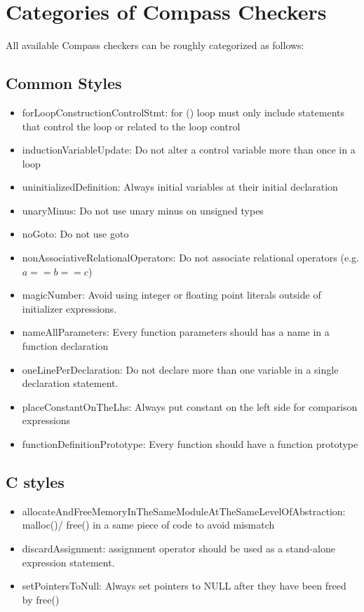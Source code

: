 \chapter{Categories of Compass Checkers}
All available Compass checkers can be roughly categorized as follows:

\section{Common Styles}
\begin{itemize}
\item forLoopConstructionControlStmt: for () loop must only include statements that control the loop or related to the loop control
\item inductionVariableUpdate: Do not alter a control variable more than once in a loop
\item uninitializedDefinition: Always initial variables at their initial declaration
\item unaryMinus: Do not use unary minus on unsigned types
\item noGoto: Do not use goto
\item nonAssociativeRelationalOperators: Do not associate relational
operators (e.g. $a==b==c$)
\item magicNumber: Avoid using integer or floating point literals outside of initializer expressions.
\item nameAllParameters: Every function parameters should has a name in a function declaration
\item oneLinePerDeclaration: Do not declare more than one variable in a single declaration statement. 
\item placeConstantOnTheLhs: Always put constant on the left side for comparison expressions
\item functionDefinitionPrototype: Every function should have a function prototype
\end{itemize}

\section{C styles}
\begin{itemize}
\item allocateAndFreeMemoryInTheSameModuleAtTheSameLevelOfAbstraction: malloc()/ free() in a same piece of code to avoid mismatch
\item discardAssignment: assignment operator should be used as a stand-alone expression statement.
\item setPointersToNull: Always set pointers to NULL after they have been freed by free()
\end{itemize}

